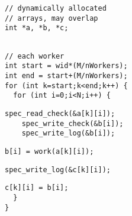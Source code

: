 \begin{lstlisting}[morekeywords={g_qCount},belowskip=0pt, firstnumber=1, name=ver2a]
// dynamically allocated
// arrays, may overlap
int *a, *b, *c;
\end{lstlisting}

\begin{lstlisting}[aboveskip=0pt,belowskip=0pt,backgroundcolor=\color{very-light-gray},
firstnumber=auto, name=ver2a]

// each worker 
int start = wid*(M/nWorkers);
int end = start+(M/nWorkers);
for (int k=start;k<end;k++) {
  for (int i=0;i<N;i++) {
\end{lstlisting}

\begin{lstlisting}[aboveskip=0pt,belowskip=0pt,backgroundcolor=\color{lightgray},
firstnumber=auto, name=ver2a]
    spec_read_check(&a[k][i]);
    spec_write_check(&b[i]);
    spec_write_log(&b[i]);
\end{lstlisting}


\begin{lstlisting}[aboveskip=0pt,belowskip=0pt,backgroundcolor=\color{very-light-gray},
firstnumber=auto, name=ver2a]
    b[i] = work(a[k][i]);
\end{lstlisting}

\begin{lstlisting}[aboveskip=0pt,belowskip=0pt,backgroundcolor=\color{lightgray},
firstnumber=auto, name=ver2a]
    spec_write_log(&c[k][i]);
\end{lstlisting}


\begin{lstlisting}[aboveskip=0pt,belowskip=0pt,backgroundcolor=\color{very-light-gray},
firstnumber=auto, name=ver2a]
    c[k][i] = b[i];
  }
}
\end{lstlisting}
